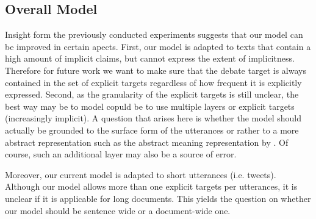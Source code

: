 \documentclass[11pt]{article}
\begin{document}
\subsection{Overall Model}
Insight form the previously conducted experiments suggests that our model can be improved in certain apects.
First, our model is adapted to texts that contain a high amount of implicit claims, but cannot express  the extent of implicitness.
Therefore for future work we want to make sure that the debate target is always contained in the set of explicit targets regardless of how frequent it is explicitly expressed.
Second, as the granularity of the explicit targets is still unclear, the best way may be to model copuld be to use multiple layers or explicit targets (increasingly implicit).
A question that arises here is whether the model should actually be grounded to the surface form of the utterances or rather to a more abstract representation such as the abstract meaning representation by .
Of course, such an additional layer may also be a source of error.

Moreover, our current model is adapted to short utterances (i.e. tweets). 
Although our model allows more than one explicit targets per utterances, it is unclear if it is applicable for long documents.
This yields the question on whether our model should be sentence wide or a document-wide one.



%
%


\end{document}
